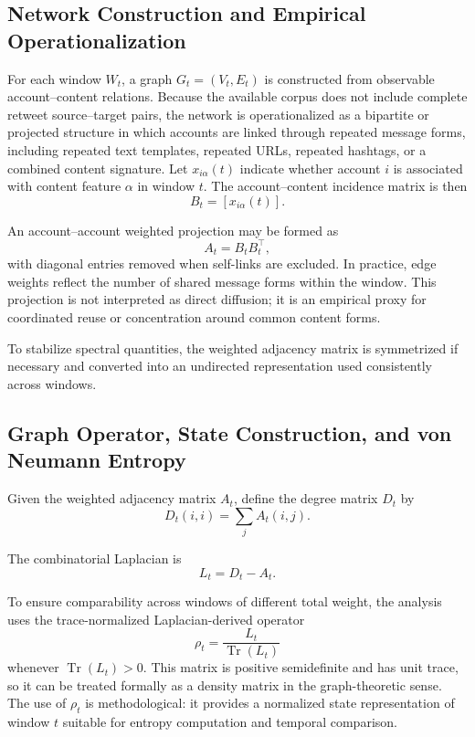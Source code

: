 \documentclass[sigconf]{acmart}
\begin{document}
\subsection{Network Construction and Empirical Operationalization}

For each window $W_t$, a graph $G_t = (V_t, E_t)$ is constructed from observable account--content relations. Because the available corpus does not include complete retweet source--target pairs, the network is operationalized as a bipartite or projected structure in which accounts are linked through repeated message forms, including repeated text templates, repeated URLs, repeated hashtags, or a combined content signature. Let $x_{i\alpha}(t)$ indicate whether account $i$ is associated with content feature $\alpha$ in window $t$. The account--content incidence matrix is then
\begin{equation}
B_t = [x_{i\alpha}(t)].
\end{equation}

An account--account weighted projection may be formed as
\begin{equation}
A_t = B_t B_t^{\top},
\end{equation}
with diagonal entries removed when self-links are excluded. In practice, edge weights reflect the number of shared message forms within the window. This projection is not interpreted as direct diffusion; it is an empirical proxy for coordinated reuse or concentration around common content forms.

To stabilize spectral quantities, the weighted adjacency matrix is symmetrized if necessary and converted into an undirected representation used consistently across windows.

\subsection{Graph Operator, State Construction, and von Neumann Entropy}

Given the weighted adjacency matrix $A_t$, define the degree matrix $D_t$ by
\begin{equation}
D_t(i,i) = \sum_j A_t(i,j).
\end{equation}

The combinatorial Laplacian is
\begin{equation}
L_t = D_t - A_t.
\end{equation}

To ensure comparability across windows of different total weight, the analysis uses the trace-normalized Laplacian-derived operator
\begin{equation}
\rho_t = \frac{L_t}{\operatorname{Tr}(L_t)}
\end{equation}
whenever $\operatorname{Tr}(L_t) > 0$. This matrix is positive semidefinite and has unit trace, so it can be treated formally as a density matrix in the graph-theoretic sense. The use of $\rho_t$ is methodological: it provides a normalized state representation of window $t$ suitable for entropy computation and temporal comparison.
\end{document}
